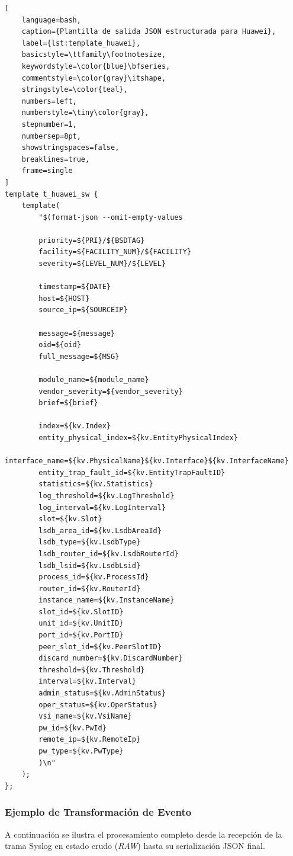 \begin{lstlisting}[
    language=bash,
    caption={Plantilla de salida JSON estructurada para Huawei},
    label={lst:template_huawei},
    basicstyle=\ttfamily\footnotesize,
    keywordstyle=\color{blue}\bfseries,
    commentstyle=\color{gray}\itshape,
    stringstyle=\color{teal},
    numbers=left,
    numberstyle=\tiny\color{gray},
    stepnumber=1,
    numbersep=8pt,
    showstringspaces=false,
    breaklines=true,
    frame=single
]
template t_huawei_sw {
    template(
        "$(format-json --omit-empty-values

        priority=${PRI}/${BSDTAG}
        facility=${FACILITY_NUM}/${FACILITY}
        severity=${LEVEL_NUM}/${LEVEL}

        timestamp=${DATE}
        host=${HOST}
        source_ip=${SOURCEIP}

        message=${message}
        oid=${oid}
        full_message=${MSG}

        module_name=${module_name}
        vendor_severity=${vendor_severity}
        brief=${brief}

        index=${kv.Index}
        entity_physical_index=${kv.EntityPhysicalIndex}
        interface_name=${kv.PhysicalName}${kv.Interface}${kv.InterfaceName}
        entity_trap_fault_id=${kv.EntityTrapFaultID}
        statistics=${kv.Statistics}
        log_threshold=${kv.LogThreshold}
        log_interval=${kv.LogInterval}
        slot=${kv.Slot}
        lsdb_area_id=${kv.LsdbAreaId}
        lsdb_type=${kv.LsdbType}
        lsdb_router_id=${kv.LsdbRouterId}
        lsdb_lsid=${kv.LsdbLsid}
        process_id=${kv.ProcessId}
        router_id=${kv.RouterId}
        instance_name=${kv.InstanceName}
        slot_id=${kv.SlotID}
        unit_id=${kv.UnitID}
        port_id=${kv.PortID}
        peer_slot_id=${kv.PeerSlotID}
        discard_number=${kv.DiscardNumber}
        threshold=${kv.Threshold}
        interval=${kv.Interval}
        admin_status=${kv.AdminStatus}
        oper_status=${kv.OperStatus}
        vsi_name=${kv.VsiName}
        pw_id=${kv.PwId}
        remote_ip=${kv.RemoteIp}
        pw_type=${kv.PwType}
        )\n"
    );
};
\end{lstlisting}

\subsubsection{Ejemplo de Transformación de Evento}

A continuación se ilustra el procesamiento completo desde la recepción de la trama Syslog en estado crudo (\textit{RAW}) hasta su serialización JSON final.

